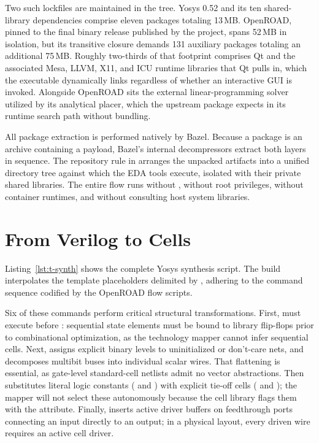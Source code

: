 \documentclass[journal,9pt]{IEEEtran}
\begin{document}
Two such lockfiles are maintained in the tree. Yosys 0.52 and its ten
shared-library dependencies comprise eleven packages totaling
13\,MB. OpenROAD, pinned to the final binary release published by the
project, spans 52\,MB in isolation, but its transitive closure demands
131 auxiliary packages totaling an additional 75\,MB. Roughly two-thirds
of that footprint comprises Qt and the associated Mesa, LLVM, X11, and
ICU runtime libraries that Qt pulls in, which the executable dynamically
links regardless of whether an interactive GUI is invoked. Alongside
OpenROAD sits the external linear-programming solver utilized by its
analytical placer, which the upstream package expects in its runtime
search path without bundling.

All package extraction is performed natively by Bazel. Because a
 package is an  archive containing a 
payload, Bazel's internal decompressors extract both layers in sequence.
The repository rule in  arranges the unpacked
artifacts into a unified directory tree against which the EDA tools
execute, isolated with their private shared libraries. The entire flow
runs without , without root privileges, without container
runtimes, and without consulting host system libraries.

\section{From Verilog to Cells}
\label{sec:t-cells}

Listing~\ref{lst:t-synth} shows the complete Yosys synthesis script. The
build interpolates the template placeholders delimited by ,
adhering to the command sequence codified by the OpenROAD flow scripts.



Six of these commands perform critical structural transformations.
First,  must execute before : sequential state
elements must be bound to library flip-flops prior to combinational
optimization, as the technology mapper cannot infer sequential cells.
Next,  assigns explicit binary levels to uninitialized or
don't-care nets, and  decomposes multibit buses into
individual scalar wires. That flattening is essential, as gate-level
standard-cell netlists admit no vector abstractions. Then 
substitutes literal logic constants ( and ) with
explicit tie-off cells ( and ); the mapper will
not select these autonomously because the cell library flags them with
the  attribute. Finally,  inserts active
driver buffers on feedthrough ports connecting an input directly to an
output; in a physical layout, every driven wire requires an active cell
driver.
\end{document}
